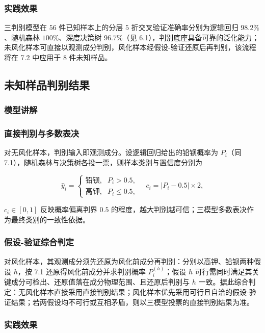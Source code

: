 \documentclass{ctexart}
\begin{document}
\subsubsection{实践效果}

三判别模型在 $56$ 件已知样本上的分层 $5$ 折交叉验证准确率分别为逻辑回归 $98.2\%$、随机森林 $100\%$、深度决策树 $96.7\%$（见 6.1），判别底座具备可靠的泛化能力；未风化样本可直接以观测成分判别，风化样本经假设-验证还原后再判别，该流程将在 7.2 中应用于 $8$ 件未知样品。

\subsection{未知样品判别结果}

\subsubsection{模型讲解}

\subsubsection{直接判别与多数表决}

对无风化样本，判别输入即观测成分。设逻辑回归给出的铅钡概率为 $P_i$（同 7.1），随机森林与决策树各投一票，则样本类别与置信度分别为

\begin{equation*}
\widehat y_i=\begin{cases}\text{铅钡},&P_i>0.5,\\\text{高钾},&P_i\le0.5,\end{cases}\quad c_i=|P_i-0.5|\times2,
\end{equation*}

$c_i\in[0,1]$ 反映概率偏离判界 $0.5$ 的程度，越大判别越可信；三模型多数表决作为最终类别的一致性依据。


\subsubsection{假设-验证综合判定}

对风化样本，其观测成分须先还原为风化前成分再判别：分别以高钾、铅钡两种假设 $h$，按 7.1 还原得风化前成分并求判别概率 $P_i^{(h)}$；假设 $h$ 可行需同时满足其关键成分可检出、还原值落在成分物理范围、且还原后判别与 $h$ 一致。据此综合判定：无风化样本直接采用直接判别结果；风化样本优先采用可行且自洽的假设-验证结果；若两假设均不可行或互相矛盾，则以三模型投票的直接判别结果为准。


\subsubsection{实践效果}
\end{document}
